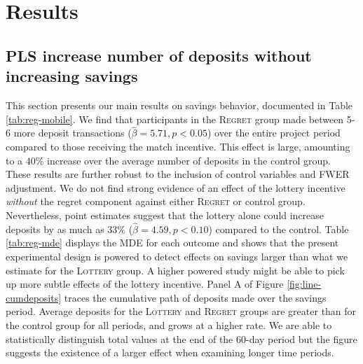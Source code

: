 \documentclass[11pt]{article}
\begin{document}
\section{Results} \label{sec:results}


	\subsection{PLS increase number of deposits without increasing savings}

		This section presents our main results on savings behavior, documented in Table \ref{tab:reg-mobile}. We find that participants in the \textsc{Regret} group made between 5-6 more deposit transactions ($\hat \beta = 5.71, p < 0.05$) over the entire project period compared to those receiving the match incentive. This effect is large, amounting to a 40\% increase over the average number of deposits in the control group. These results are further robust to the inclusion of control variables and FWER adjustment. We do not find strong evidence of an effect of the lottery incentive \textit{without} the regret component against either \textsc{Regret} or control group. Nevertheless, point estimates suggest that the lottery alone could increase deposits by as much as 33\% ($\hat \beta = 4.59, p < 0.10$) compared to the control. Table \ref{tab:reg-mde} displays the MDE for each outcome and shows that the present experimental design is powered to detect effects on savings larger than what we estimate for the \textsc{Lottery} group. A higher powered study might be able to pick up more subtle effects of the lottery incentive. Panel A of Figure \ref{fig:line-cumdeposits} traces the cumulative path of deposits made over the savings period. Average deposits for the \textsc{Lottery} and \textsc{Regret} groups are greater than for the control group for all periods, and grows at a higher rate. We are able to statistically distinguish total values at the end of the 60-day period but the figure suggests the existence of a larger effect when examining longer time periods.

\end{document}
